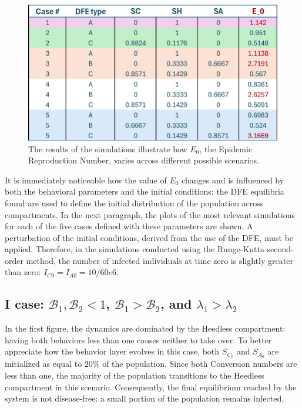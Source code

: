 \begin{figure}[h]
	\centering
	\includegraphics[width=0.6\linewidth]{"1_corpo/figure/Valori DFE e E_0_caso_3"}
	\caption[$E_0$ simulation results]{The results of the simulations illustrate how $E_0$, the Epidemic Reproduction Number, varies across different possible scenarios.}
	\label{fig:valori-dfe-e-e0caso3}
\end{figure}
It is immediately noticeable how the value of $E_0$ changes and is influenced by both the behavioral parameters and the initial conditions: the DFE equilibria found are used to define the initial distribution of the population across compartments.
In the next paragraph, the plots of the most relevant simulations for each of the five cases defined with these parameters are shown. A perturbation of the initial conditions, derived from the use of the DFE, must be applied. Therefore, in the simulations conducted using the Runge-Kutta second-order method, the number of infected individuals at time zero is slightly greater than zero: $I_{C0} = I_{A0} = 10/60e6$.

\subsection{I case: $\mathcal{B}_1, \mathcal{B}_2 <1$, $\mathcal{B}_1 >  \mathcal{B}_2$, and $\lambda_1 > \lambda_2$}
 
In the first figure, the dynamics are dominated by the Heedless compartment: having both behaviors less than one causes neither to take over.
To better appreciate how the behavior layer evolves in this case, both $S_{C_0}$ and $S_{A_0}$ are initialized as equal to $20\%$ of the population. Since both Conversion numbers are less than one, the majority of the population transitions to the Heedless compartment in this scenario. Consequently, the final equilibrium reached by the system is not disease-free: a small portion of the population remains infected.

